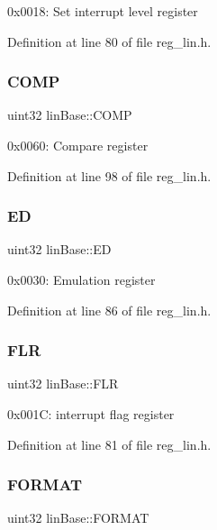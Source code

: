 0x0018\+: Set interrupt level register 

Definition at line 80 of file reg\+\_\+lin.\+h.

\mbox{\label{structlinBase_a9f7982b210803395788ece985b01ea03}} 
\subsubsection{\texorpdfstring{C\+O\+MP}{COMP}}
{\footnotesize\ttfamily uint32 lin\+Base\+::\+C\+O\+MP}

0x0060\+: Compare register 

Definition at line 98 of file reg\+\_\+lin.\+h.

\mbox{\label{structlinBase_a63f86b1e8a5bedc909a1cb67f11201bc}} 
\subsubsection{\texorpdfstring{ED}{ED}}
{\footnotesize\ttfamily uint32 lin\+Base\+::\+ED}

0x0030\+: Emulation register 

Definition at line 86 of file reg\+\_\+lin.\+h.

\mbox{\label{structlinBase_a264cdfce40f6301ce574807f9e88a292}} 
\subsubsection{\texorpdfstring{F\+LR}{FLR}}
{\footnotesize\ttfamily uint32 lin\+Base\+::\+F\+LR}

0x001C\+: interrupt flag register 

Definition at line 81 of file reg\+\_\+lin.\+h.

\mbox{\label{structlinBase_a6d6aa6d9229d3160be445f73feb4b791}} 
\subsubsection{\texorpdfstring{F\+O\+R\+M\+AT}{FORMAT}}
{\footnotesize\ttfamily uint32 lin\+Base\+::\+F\+O\+R\+M\+AT}

